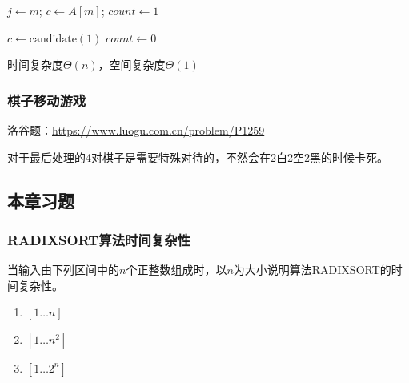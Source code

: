 \documentclass[./../main.tex]{subfiles}
\begin{document}
\begin{algorithm}[h]
    \BlankLine
    $j \gets m$; $c \gets A[m]$; $count \gets 1$\;
    \caption{candidate(m)}
\end{algorithm}

\begin{algorithm}[h]
    \BlankLine
    $c \gets \text{candidate}(1)$\; 
    $count \gets 0$\;
    \caption{MAJORITY}
\end{algorithm}

时间复杂度$\Theta(n)$，空间复杂度$\Theta(1)$

\subsubsection{棋子移动游戏}
洛谷题：\url{https://www.luogu.com.cn/problem/P1259}

对于最后处理的4对棋子是需要特殊对待的，不然会在2白2空2黑的时候卡死。

\subsection{本章习题}
\subsubsection{RADIXSORT算法时间复杂性}
当输入由下列区间中的$n$个正整数组成时，以$n$为大小说明算法RADIXSORT的时间复杂性。

\begin{enumerate}
    \item $[1 \ldots n]$
    \item $[1 \ldots n^{2}]$
    \item $[1 \ldots 2^{n}]$
\end{enumerate}
\end{document}
